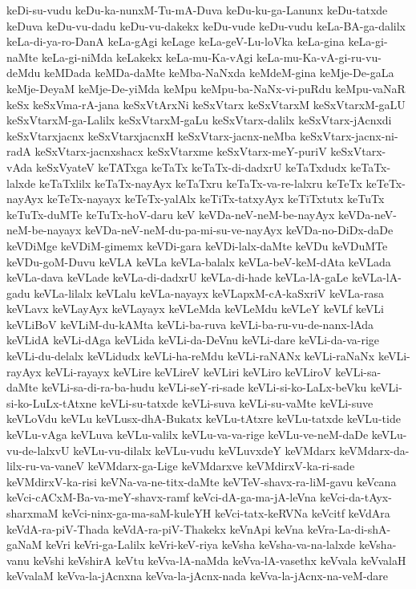 {keDi-su-vudu
keDu-ka-nunxM-Tu-mA-Duva
keDu-ku-ga-Lanunx
keDu-tatxde
keDuva
keDu-vu-dadu
keDu-vu-dakekx
keDu-vude
keDu-vudu
keLa-BA-ga-dalilx
keLa-di-ya-ro-DanA
keLa-gAgi
keLage
keLa-geV-Lu-loVka
keLa-gina
keLa-gi-naMte
keLa-gi-niMda
keLakekx
keLa-mu-Ka-vAgi
keLa-mu-Ka-vA-gi-ru-vu-deMdu
keMDada
keMDa-daMte
keMba-NaNxda
keMdeM-gina
keMje-De-gaLa
keMje-DeyaM
keMje-De-yiMda
keMpu
keMpu-ba-NaNx-vi-puRdu
keMpu-vaNaR
keSx
keSxVma-rA-jana
keSxVtArxNi
keSxVtarx
keSxVtarxM
keSxVtarxM-gaLU
keSxVtarxM-ga-Lalilx
keSxVtarxM-gaLu
keSxVtarx-dalilx
keSxVtarx-jAcnxdi
keSxVtarxjacnx
keSxVtarxjacnxH
keSxVtarx-jacnx-neMba
keSxVtarx-jacnx-ni-radA
keSxVtarx-jacnxshacx
keSxVtarxme
keSxVtarx-meY-puriV
keSxVtarx-vAda
keSxVyateV
keTATxga
keTaTx
keTaTx-di-dadxrU
keTaTxdudx
keTaTx-lalxde
keTaTxlilx
keTaTx-nayAyx
keTaTxru
keTaTx-va-re-lalxru
keTeTx
keTeTx-nayAyx
keTeTx-nayayx
keTeTx-yalAlx
keTiTx-tatxyAyx
keTiTxtutx
keTuTx
keTuTx-duMTe
keTuTx-hoV-daru
keV
keVDa-neV-neM-be-nayAyx
keVDa-neV-neM-be-nayayx
keVDa-neV-neM-du-pa-mi-su-ve-nayAyx
keVDa-no-DiDx-daDe
keVDiMge
keVDiM-gimemx
keVDi-gara
keVDi-lalx-daMte
keVDu
keVDuMTe
keVDu-goM-Duvu
keVLA
keVLa
keVLa-balalx
keVLa-beV-keM-dAta
keVLada
keVLa-dava
keVLade
keVLa-di-dadxrU
keVLa-di-hade
keVLa-lA-gaLe
keVLa-lA-gadu
keVLa-lilalx
keVLalu
keVLa-nayayx
keVLapxM-cA-kaSxriV
keVLa-rasa
keVLavx
keVLayAyx
keVLayayx
keVLeMda
keVLeMdu
keVLeY
keVLf
keVLi
keVLiBoV
keVLiM-du-kAMta
keVLi-ba-ruva
keVLi-ba-ru-vu-de-nanx-lAda
keVLidA
keVLi-dAga
keVLida
keVLi-da-DeVnu
keVLi-dare
keVLi-da-va-rige
keVLi-du-delalx
keVLidudx
keVLi-ha-reMdu
keVLi-raNANx
keVLi-raNaNx
keVLi-rayAyx
keVLi-rayayx
keVLire
keVLireV
keVLiri
keVLiro
keVLiroV
keVLi-sa-daMte
keVLi-sa-di-ra-ba-hudu
keVLi-seY-ri-sade
keVLi-si-ko-LaLx-beVku
keVLi-si-ko-LuLx-tAtxne
keVLi-su-tatxde
keVLi-suva
keVLi-su-vaMte
keVLi-suve
keVLoVdu
keVLu
keVLusx-dhA-Bukatx
keVLu-tAtxre
keVLu-tatxde
keVLu-tide
keVLu-vAga
keVLuva
keVLu-valilx
keVLu-va-va-rige
keVLu-ve-neM-daDe
keVLu-vu-de-lalxvU
keVLu-vu-dilalx
keVLu-vudu
keVLuvxdeY
keVMdarx
keVMdarx-da-lilx-ru-va-vaneV
keVMdarx-ga-Lige
keVMdarxve
keVMdirxV-ka-ri-sade
keVMdirxV-ka-risi
keVNa-va-ne-titx-daMte
keVTeV-shavx-ra-liM-gavu
keVcana
keVci-cACxM-Ba-va-meY-shavx-ramf
keVci-dA-ga-ma-jA-leVna
keVci-da-tAyx-sharxmaM
keVci-ninx-ga-ma-saM-kuleYH
keVci-tatx-keRVNa
keVcitf
keVdAra
keVdA-ra-piV-Thada
keVdA-ra-piV-Thakekx
keVnApi
keVna
keVra-La-di-shA-gaNaM
keVri
keVri-ga-Lalilx
keVri-keV-riya
keVsha
keVsha-va-na-lalxde
keVsha-vanu
keVshi
keVshirA
keVtu
keVva-lA-naMda
keVva-lA-vasethx
keVvala
keVvalaH
keVvalaM
keVva-la-jAcnxna
keVva-la-jAcnx-nada
keVva-la-jAcnx-na-veM-dare
}
